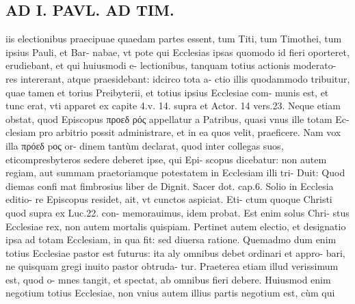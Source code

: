 \documentclass{article}
\begin{document}
\begin{pages}
\section*{AD I. PAVL. AD TIM. }
\marginpar{[ p.oi5 ]}\pstart iis electionibus praecipuae quaedam partes essent, tum Titi, tum Timothei, tum ipsius Pauli, et Bar- nabae, vt pote qui Ecclesias ipsas quomodo id fieri oporteret, erudiebant, et qui huiusmodi e- lectionibus, tanquam totius actionis moderato- res intererant, atque praesidebant: idcirco tota a- ctio illis quodammodo tribuitur, quae tamen et torius Preibyterii, et totius ipsius Ecclesiae com- munis est, et tunc erat, vti apparet ex capite 4.v. 14. supra et Actor. 14 vers.23.  \pend\pstart Neque etiam obstat, quod Episcopus προεδ ρός appellatur a Patribus, quasi vnus ille totam Ec- clesiam pro arbitrio possit administrare, et in ea quos velit, praeficere. Nam vox illa πρόεδ pος or- dinem tantùm declarat, quod inter collegas suos, eticompresbyteros sedere deberet ipse, qui Epi- scopus dicebatur: non autem regiam, aut summam praetoriamque potestatem in Ecclesiam illi tri- Duit: Quod diemas confi mat fimbrosius liber  de Dignit. Sacer dot. cap.6. Solio in Ecclesia editio- re Episcopus residet, ait, vt cunctos aspiciat. Eti- ctum quoque Christi quod supra ex Luc.22. con- memorauimus, idem probat. Est enim solus Chri- stus Ecclesiae rex, non autem mortalis quispiam.  \pend\pstart Pertinet autem electio, et designatio ipsa ad totam Ecclesiam, in qua fit: sed diuersa ratione. Quemadmo dum enim totius Ecclesiae pastor est futurus: ita aly omnibus debet ordinari et appro- bari, ne quisquam gregi inuito pastor obtruda- tur. Praeterea etiam illud verissimum est, quod o- mnes tangit, et spectat, ab omnibus fieri debere. Huiusmod enim negotium totius Ecclesiae, non vnius autem illius partis negotium est, cùm qui  \pend

\end{pages}
\end{document}

